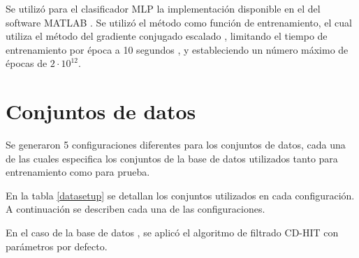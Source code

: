\documentclass[12pt,bibliography=oldstyle,DIV=12,parskip=half-,titlepage]{scrartcl}
\begin{document}
Se utilizó para el clasificador MLP la implementación disponible en el
 del software MATLAB .  Se
utilizó el método  como función de entrenamiento, el
cual utiliza el método del gradiente conjugado escalado ,
limitando el tiempo de entrenamiento por época a 10 segundos
, y estableciendo un número máximo de épocas de
$2\cdot10^{12}$.
%
\section{Conjuntos de datos}
Se generaron 5 configuraciones diferentes para los conjuntos de datos, 
cada una de las cuales especifica los conjuntos de la base de datos 
utilizados tanto para entrenamiento como para prueba.

En la tabla \ref{datasetup} se detallan los conjuntos utilizados en
cada configuración.  A continuación se describen cada una de las
configuraciones.

En el caso de la base de datos , se aplicó el algoritmo
de filtrado CD-HIT \cite{greedy} con parámetros por
defecto. 
\end{document}
